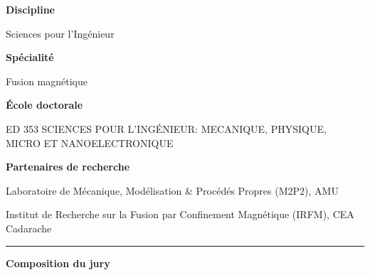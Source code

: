 
\begin{center}
	\begin{minipage}[t]{.37\linewidth}
    	    \vspace{.5em}
        	\textsf{\textbf{Discipline}}
        	
        	\textsf{Sciences pour l'Ingénieur}
        	
    	    \vspace{1em}
        	\textsf{\textbf{Spécialité}}
        	
        	\textsf{Fusion magnétique}
        	
    	    \vspace{2em}
        	\textsf{\textbf{École doctorale}}
        	
        	\textsf{ED 353 SCIENCES POUR L'INGÉNIEUR: MECANIQUE, PHYSIQUE, MICRO ET NANOELECTRONIQUE}
        	
    	    \vspace{1em}
        	\textsf{\textbf{Partenaires de recherche}}
        	
        	\textsf{Laboratoire de Mécanique, Modélisation \& Procédés Propres (M2P2), AMU}
        	
    	    \vspace{0.4em}			        	
        	\textsf{Institut de Recherche sur la Fusion par Confinement Magnétique (IRFM), CEA Cadarache}

	\end{minipage}\hfill
	\begin{minipage}[t]{.02\linewidth}
		\centering
	    \rule[-280pt]{1pt}{280pt}
	\end{minipage}\hfill
	\begin{minipage}[t]{.6\linewidth}
	    \vspace{.5em}
    	\textsf{\textbf{Composition du jury}}


\end{minipage}
\end{center}
